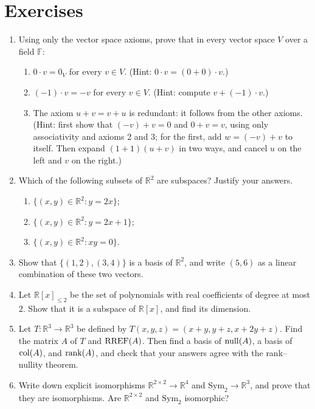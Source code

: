\section{Exercises}\label{L1-sec:exercises}
\begin{enumerate}[leftmargin=*]
	\item\label{L1-ex:axioms} \homework{} Using only the vector space axioms, prove that in every vector space $V$ over a field $\mathbb{F}$:
	\begin{enumerate}
		\item $0 \cdot v = 0_V$ for every $v \in V$. (Hint: $0 \cdot v = (0 + 0) \cdot v$.)
		\item $(-1) \cdot v = -v$ for every $v \in V$. (Hint: compute $v + (-1) \cdot v$.)
		\item The axiom $u + v = v + u$ is redundant: it follows from the other axioms. (Hint: first show that $(-v) + v = 0$ and $0 + v = v$, using only associativity and axioms 2 and 3; for the first, add $w = (-v) + v$ to itself. Then expand $(1 + 1)(u + v)$ in two ways, and cancel $u$ on the left and $v$ on the right.)
	\end{enumerate}
	\item \homework{} Which of the following subsets of $\mathbb{R}^2$ are subspaces? Justify your answers.
	\begin{enumerate}
		\item $\{(x, y) \in \mathbb{R}^2 : y = 2x\}$;
		\item $\{(x, y) \in \mathbb{R}^2 : y = 2x + 1\}$;
		\item $\{(x, y) \in \mathbb{R}^2 : xy = 0\}$.
	\end{enumerate}
	\item \homework{} Show that $\{(1, 2), (3, 4)\}$ is a basis of $\mathbb{R}^2$, and write $(5, 6)$ as a linear combination of these two vectors.
	\item Let $\mathbb{R}[x]_{\leq 2}$ be the set of polynomials with real coefficients of degree at most $2$. Show that it is a subspace of $\mathbb{R}[x]$, and find its dimension.
	\item \homework{} Let $T: \mathbb{R}^3 \to \mathbb{R}^3$ be defined by $T(x, y, z) = (x + y, y + z, x + 2y + z)$. Find the matrix $A$ of $T$ and $\operatorname{RREF}(A)$. Then find a basis of $\operatorname{null}(A)$, a basis of $\operatorname{col}(A)$, and $\operatorname{rank}(A)$, and check that your answers agree with the rank--nullity theorem.
	\item \homework{} Write down explicit isomorphisms $\mathbb{R}^{2 \times 2} \to \mathbb{R}^4$ and $\mathrm{Sym}_2 \to \mathbb{R}^3$, and prove that they are isomorphisms. Are $\mathbb{R}^{2 \times 2}$ and $\mathrm{Sym}_2$ isomorphic?

\end{enumerate}
